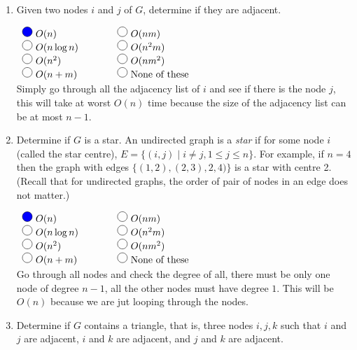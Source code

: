 \documentclass[11pt]{article}
\def\ans#1{{\color{ans}#1}}
\newcommand{\fillinMC}[1]{\fillinMCmath{\mbox{#1}}}
\newcommand{\fillinMCmath}[1]{\begin{tikzpicture}\draw circle [radius=0.5em];\end{tikzpicture}\ #1}
\newcommand{\fillinMCmathsoln}[1]{\begin{tikzpicture}\draw[black, fill=blue] circle [radius=0.5em];\end{tikzpicture}\ #1}
\begin{document}
\begin{enumerate}
\item Given two nodes $i$ and $j$ of $G$, determine if they are adjacent.

$\begin{array}{lcl}
\fillinMCmathsoln{O(n)} & \qquad & \fillinMCmath{O(nm)} \\
\fillinMCmath{O(n\log n)} & \qquad & \fillinMCmath{O(n^2m)}\\
\fillinMCmath{O(n^2)} & \qquad & \fillinMCmath{O(nm^2)}\\
\fillinMCmath{O(n+m)} & \qquad & \fillinMC{None of these}
\end{array}$\\
\ans{
  Simply go through all the adjacency list of $i$ and see if there is the node $j$, this will 
  take at worst $O(n)$ time because the size of the adjacency list can be at most $n-1$.
}
\item Determine if $G$ is a star. An undirected graph is a \emph{star} if
for some node $i$ (called the star
centre), $E = \{(i,j) \;|\; i \neq j, 1\le j \le n\}$.  For example,
if $n=4$ then the graph with edges $\{(1,2), (2,3), 2,4)\}$ is a star
with centre 2. (Recall that for undirected graphs, the order of 
pair of nodes in an edge does not matter.)

$\begin{array}{lcl}
\fillinMCmathsoln{O(n)} & \qquad & \fillinMCmath{O(nm)} \\
\fillinMCmath{O(n\log n)} & \qquad & \fillinMCmath{O(n^2m)}\\
\fillinMCmath{O(n^2)} & \qquad & \fillinMCmath{O(nm^2)}\\
\fillinMCmath{O(n+m)} & \qquad & \fillinMC{None of these}
\end{array}$\\
\ans{
  Go through all nodes and check the degree of all, there must be only one node of degree $n-1$, all 
  the other nodes must have degree $1$. This will be $O(n)$ because we are jut looping through the nodes.
}

\item Determine if $G$ contains a triangle, that is, three
nodes $i,j,k$ such that $i$ and $j$ are adjacent,
$i$ and $k$ are adjacent, and $j$ and $k$ are adjacent.


\end{enumerate}
\end{document}
